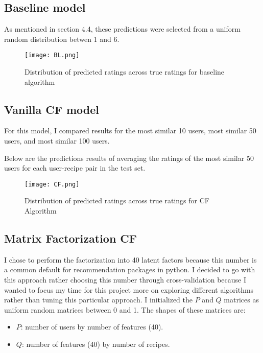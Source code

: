 \documentclass{article}
\begin{document}
\subsection {Baseline model}

As mentioned in section 4.4, these predictions were selected from a uniform random distribution betwen 1 and 6. 

\begin{figure}[H]
    \centering
    \texttt{[image: BL.png]}
    \caption{Distribution of predicted ratings across true ratings for baseline algorithm}
    \label{BL}
\end{figure}

\subsection{Vanilla CF model}

For this model, I compared results for the most similar 10 users, most similar 50 users, and most similar 100 users. 

Below are the predictions results of averaging the ratings of the most similar 50 users for each user-recipe pair in the test set. 

\begin{figure}[H]
    \centering
    \texttt{[image: CF.png]}
    \caption{Distribution of predicted ratings across true ratings for CF Algorithm}
    \label{fig:CF}
\end{figure}

\subsection{Matrix Factorization CF}

I chose to perform the factorization into 40 latent factors because this number is a common default for recommendation packages in python. I decided to go with this approach rather choosing this number through cross-validation because I wanted to focus my time for this project more on exploring different algorithms rather than tuning this particular approach.  I initialized the $P$ and $Q$ matrices as uniform random matrices between 0 and 1. The shapes of these matrices are:

\begin{itemize}
    \item $P$: number of users by number of features (40).
    \item $Q$: number of features (40) by number of recipes.  
\end{itemize}
\end{document}
